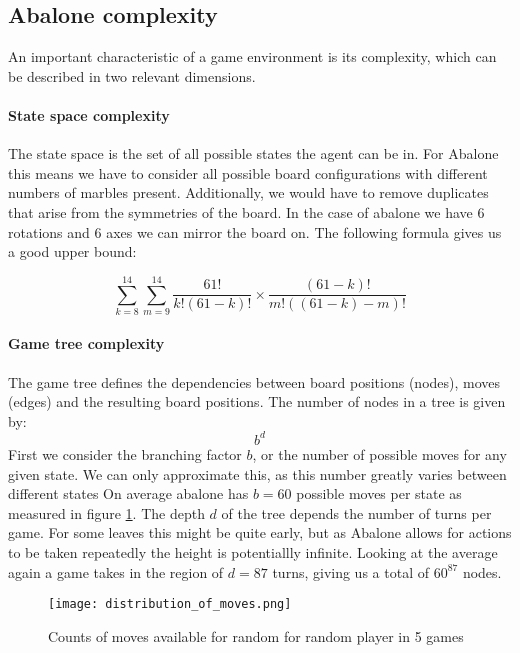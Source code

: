 \subsection{Abalone complexity}

An important characteristic of a game environment is its complexity, which can be described in two relevant dimensions.

\paragraph{State space complexity}

The state space is the set of all possible states the agent can be in.\cite[p. 150]{russell_artificial_2021} For Abalone this means we have to consider all possible board configurations with different numbers of marbles present. Additionally, we would have to remove duplicates that arise from the symmetries of the board. In the case of abalone we have 6 rotations and 6 axes we can mirror the board on. The following formula gives us a good upper bound:

$$
    \sum_{k=8}^{14}\sum_{m=9}^{14}\frac{61!}{k!(61-k)!}\times\frac{(61-k)!}{m!((61-k)-m)!}
$$

\paragraph{Game tree complexity} The game tree defines the dependencies between board positions (nodes), moves (edges) and the resulting board positions. The number of nodes in a tree is given by:
$$
    b^d
$$
First we consider the branching factor $ b $, or the number of possible moves for any given state. We can only approximate this, as this number greatly varies between different states On average abalone has $ b = 60 $ possible moves per state as measured in figure \ref{branching_factor}. The depth $ d $ of the tree depends the number of turns per game. For some leaves this might be quite early, but as Abalone allows for actions to be taken repeatedly the height is potentiallly infinite. Looking at the average again a game takes in the region of $ d = 87 $ turns, giving us a total of $60^{87}$ nodes. \cite{lemmens_constructing_2005}

\begin{figure}
    \centering
    \texttt{[image: distribution\_of\_moves.png]}
    \caption{Counts of moves available for random for random player in 5 games}
    \label{branching_factor}
\end{figure}

